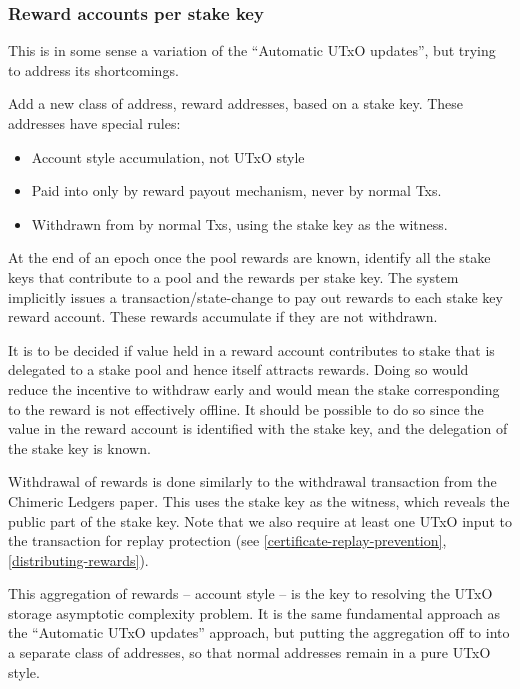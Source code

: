 \documentclass[11pt,a4paper]{article}
\begin{document}
\subsubsection{Reward accounts per stake key}
\label{reward-accounts-per-stake-key}

This is in some sense a variation of the ``Automatic UTxO updates'', but
trying to address its shortcomings.

Add a new class of address, reward addresses, based on a stake key.
These addresses have special rules:

\begin{itemize}
\item
  Account style accumulation, not UTxO style
\item
  Paid into only by reward payout mechanism, never by normal Txs.
\item
  Withdrawn from by normal Txs, using the stake key as the witness.
\end{itemize}

At the end of an epoch once the pool rewards are known, identify all the
stake keys that contribute to a pool and the rewards per stake key. The
system implicitly issues a transaction/state-change to pay out rewards
to each stake key reward account. These rewards accumulate if they are
not withdrawn.

It is to be decided if value held in a reward account contributes to
stake that is delegated to a stake pool and hence itself attracts
rewards. Doing so would reduce the incentive to withdraw early and would
mean the stake corresponding to the reward is not effectively offline.
It should be possible to do so since the value in the reward account is
identified with the stake key, and the delegation of the stake key is
known.

Withdrawal of rewards is done similarly to the withdrawal transaction from the
Chimeric Ledgers paper. This uses the stake key as the witness, which reveals
the public part of the stake key. Note that we also require at least one UTxO
input to the transaction for replay protection (see
\cref{certificate-replay-prevention}, \cref{distributing-rewards}).

This aggregation of rewards -- account style -- is the key to resolving
the UTxO storage asymptotic complexity problem. It is the same
fundamental approach as the ``Automatic UTxO updates'' approach, but
putting the aggregation off to into a separate class of addresses, so
that normal addresses remain in a pure UTxO style.
\end{document}
